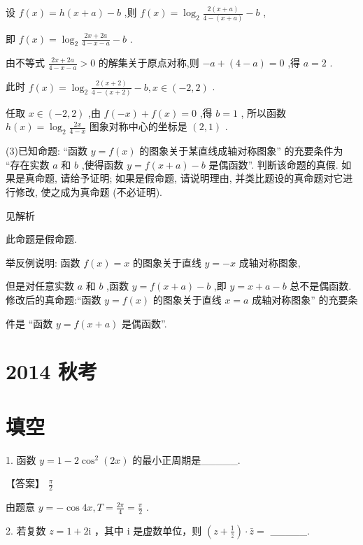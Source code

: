 \documentclass[10pt]{article}
\begin{document}
设 \(f\left( x\right)  = h\left( {x + a}\right)  - b\) ,则 \(f\left( x\right)  = {\log }_{2}\frac{2\left( {x + a}\right) }{4 - \left( {x + a}\right) } - b\) ,

即 \(f\left( x\right)  = {\log }_{2}\frac{{2x} + {2a}}{4 - x - a} - b\) .

由不等式 \(\frac{{2x} + {2a}}{4 - x - a} > 0\) 的解集关于原点对称,则 \(- a + \left( {4 - a}\right)  = 0\) ,得 \(a = 2\) .

此时 \(f\left( x\right)  = {\log }_{2}\frac{2\left( {x + 2}\right) }{4 - \left( {x + 2}\right) } - b,x \in  \left( {-2,2}\right)\) .

任取 \(x \in  \left( {-2,2}\right)\) ,由 \(f\left( {-x}\right)  + f\left( x\right)  = 0\) ,得 \(b = 1\) , 所以函数 \(h\left( x\right)  = {\log }_{2}\frac{2x}{4 - x}\) 图象对称中心的坐标是 \(\left( {2,1}\right)\) .

(3)已知命题: “函数 \(y = f\left( x\right)\) 的图象关于某直线成轴对称图象” 的充要条件为 “存在实数 \(a\) 和 \(b\) ,使得函数 \(y = f\left( {x + a}\right)  - b\) 是偶函数”. 判断该命题的真假. 如果是真命题, 请给予证明; 如果是假命题, 请说明理由, 并类比题设的真命题对它进行修改, 使之成为真命题 (不必证明).

见解析

此命题是假命题.

举反例说明: 函数 \(f\left( x\right)  = x\) 的图象关于直线 \(y =  - x\) 成轴对称图象,

但是对任意实数 \(a\) 和 \(b\) ,函数 \(y = f\left( {x + a}\right)  - b\) ,即 \(y = x + a - b\) 总不是偶函数. 修改后的真命题:“函数 \(y = f\left( x\right)\) 的图象关于直线 \(x = a\) 成轴对称图象” 的充要条

件是 “函数 \(y = f\left( {x + a}\right)\) 是偶函数”.

\section*{2014 秋考}

\section*{填空}

1. 函数 \(y = 1 - 2{\cos }^{2}\left( {2x}\right)\) 的最小正周期是\_\_\_\_\_.

【答案】 \(\frac{\pi }{2}\)

由题意 \(y =  - \cos {4x},T = \frac{2\pi }{4} = \frac{\pi }{2}\) .

2. 若复数 \(z = 1 + {2\mathrm{i}}\) ，其中 \(\mathrm{i}\) 是虚数单位，则 \(\left( {z + \frac{1}{\bar{z}}}\right)  \cdot  \bar{z} =\) \_\_\_\_\_.
\end{document}
